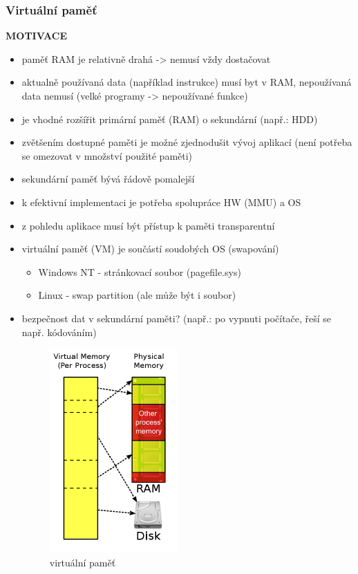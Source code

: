 \documentclass[10pt,a4paper]{article}
\begin{document}
\subsubsection{Virtuální paměť}
\textbf{MOTIVACE}
\begin{itemize}
	\item paměť RAM je relativně drahá -> nemusí vždy dostačovat
	\item aktualně používaná data (například instrukce) musí byt v RAM, nepoužívaná data nemusí (velké
programy -> nepoužívané funkce)
	\item je vhodné rozšířit primární paměť (RAM) o sekundární (např.: HDD)
	\item zvětšením dostupné paměti je možné zjednodušit vývoj aplikací (není potřeba se omezovat
v množství použité paměti)
	\item sekundární paměť bývá řádově pomalejší
	\item k efektivní implementaci je potřeba spolupráce HW (MMU) a OS
	\item z pohledu aplikace musí být přístup k paměti transparentní
	\item virtuální paměť (VM) je součástí soudobých OS (swapování)
	\begin{itemize}
		\item Windows NT - stránkovací soubor (pagefile.sys)
		\item Linux - swap partition (ale může být i soubor)
	\end{itemize}
	\item bezpečnost dat v sekundární paměti? (např.: po vypnuti počítače, řeší se např. kódováním)
	\begin{figure} [h]
		\includegraphics[scale=1]{img/virtualni_pamet.png}
		\caption{virtuální paměť}
	\end{figure}
\end{itemize}
\end{document}
